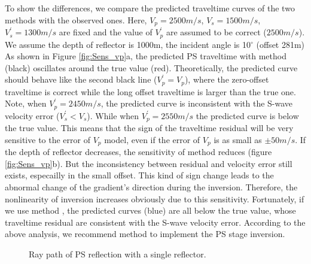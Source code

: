 \documentclass[extra,mreferee]{gji}
\newcommand{\Rome}[1]{{\bf\uppercase\expandafter{\romannumeral #1\relax}}}
\begin{document}
To show the differences, we compare the predicted traveltime
curves of the two methods with the observed ones.
Here, $V_p=2500m/s$, $V_s=1500m/s$, $V^{'}_s=1300m/s$ are fixed and the value of $V^{'}_p$
are assumed to be correct ($2500m/s$). We assume the depth of reflector is 1000m, the
incident angle is 10$^{\circ}$ (offset 281m)
As shown in Figure \ref{fig:Sens_vp}a, 
the predicted PS traveltime with method
\Rome{1} (black) oscillates around the true value (red). 
Theoretically, the predicted
curve should behave like the second black line ($V^{'}_p=V_p$), where the zero-offset traveltime is correct while
the long offset traveltime is larger than the true one. Note, when $V^{'}_p=2450m/s$, the
predicted curve is inconsistent with the S-wave velocity error
($V^{'}_s<V_s$). While when $V^{'}_p=2550m/s$ the predicted curve is below the true value. 
This means that the sign of the traveltime residual will be very sensitive to the error of $V_p$ model,  
even if the error of $V_p$ is as small as $\pm50m/s$. 
If the depth of reflector decreases, the sensitivity of method \Rome{1} reduces (figure \ref{fig:Sens_vp}b). But the
inconsistency between residual and velocity error still exists, especailly in the small offset.
This kind of sign change leads to 
the abnormal change of the gradient's direction during the inversion. Therefore, the nonlinearity of
inversion increases obviously due to this sensitivity. Fortunately, if we use method \Rome{2} ,
the predicted curves (blue) are all below the true value, whose traveltime residual are consistent
with the S-wave velocity error.
According to the above analysis, we recommend method \Rome{2} to implement the PS stage inversion.
\begin{figure}
   \centering
   \caption{Ray path of PS reflection with a single reflector.}
   \label{fig:PS_refl}
\end{figure}
\end{document}
